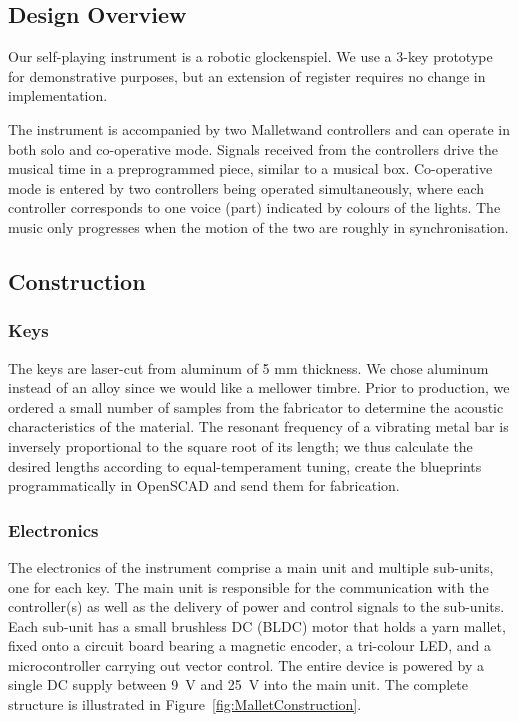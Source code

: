 \documentclass{nime-alternate} %
\begin{document}
\subsection{Design Overview}
Our self-playing instrument is a robotic glockenspiel. We use a 3-key prototype for demonstrative purposes, but an extension of register requires no change in implementation.

The instrument is accompanied by two Malletwand controllers and can operate in both solo and co-operative mode. Signals received from the controllers drive the musical time in a preprogrammed piece, similar to a musical box. Co-operative mode is entered by two controllers being operated simultaneously, where each controller corresponds to one voice (part) indicated by colours of the lights. The music only progresses when the motion of the two are roughly in synchronisation.

\subsection{Construction}
\subsubsection{Keys}
The keys are laser-cut from aluminum of 5 mm thickness. We chose aluminum instead of an alloy since we would like a mellower timbre. Prior to production, we ordered a small number of samples from the fabricator to determine the acoustic characteristics of the material. The resonant frequency of a vibrating metal bar is inversely proportional to the square root of its length; we thus calculate the desired lengths according to equal-temperament tuning, create the blueprints programmatically in OpenSCAD and send them for fabrication.

\subsubsection{Electronics}
The electronics of the instrument comprise a main unit and multiple sub-units, one for each key. The main unit is responsible for the communication with the controller(s) as well as the delivery of power and control signals to the sub-units. Each sub-unit has a small brushless DC (BLDC) motor that holds a yarn mallet, fixed onto a circuit board bearing a magnetic encoder, a tri-colour LED, and a microcontroller carrying out vector control. The entire device is powered by a single DC supply between 9~V and 25~V into the main unit. The complete structure is illustrated in Figure~\ref{fig:MalletConstruction}.
\end{document}
